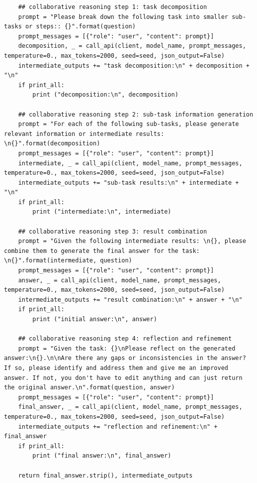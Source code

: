 \begin{lstlisting}
    ## collaborative reasoning step 1: task decomposition
    prompt = "Please break down the following task into smaller sub-tasks or steps:: {}".format(question)
    prompt_messages = [{"role": "user", "content": prompt}]
    decomposition, _ = call_api(client, model_name, prompt_messages, temperature=0., max_tokens=2000, seed=seed, json_output=False)
    intermediate_outputs += "task decomposition:\n" + decomposition + "\n"
    if print_all:
        print ("decomposition:\n", decomposition)

    ## collaborative reasoning step 2: sub-task information generation
    prompt = "For each of the following sub-tasks, please generate relevant information or intermediate results: \n{}".format(decomposition)
    prompt_messages = [{"role": "user", "content": prompt}]
    intermediate, _ = call_api(client, model_name, prompt_messages, temperature=0., max_tokens=2000, seed=seed, json_output=False)
    intermediate_outputs += "sub-task results:\n" + intermediate + "\n"
    if print_all:
        print ("intermediate:\n", intermediate)

    ## collaborative reasoning step 3: result combination  
    prompt = "Given the following intermediate results: \n{}, please combine them to generate the final answer for the task: \n{}".format(intermediate, question)
    prompt_messages = [{"role": "user", "content": prompt}]
    answer, _ = call_api(client, model_name, prompt_messages, temperature=0., max_tokens=2000, seed=seed, json_output=False)
    intermediate_outputs += "result combination:\n" + answer + "\n"
    if print_all:
        print ("initial answer:\n", answer)

    ## collaborative reasoning step 4: reflection and refinement
    prompt = "Given the task: {}\nPlease reflect on the generated answer:\n{}.\n\nAre there any gaps or inconsistencies in the answer? If so, please identify and address them and give me an improved answer. If not, you don't have to edit anything and can just return the original answer.\n".format(question, answer)
    prompt_messages = [{"role": "user", "content": prompt}]
    final_answer, _ = call_api(client, model_name, prompt_messages, temperature=0., max_tokens=2000, seed=seed, json_output=False)
    intermediate_outputs += "reflection and refinement:\n" + final_answer 
    if print_all:
        print ("final answer:\n", final_answer)

    return final_answer.strip(), intermediate_outputs



\end{lstlisting}
